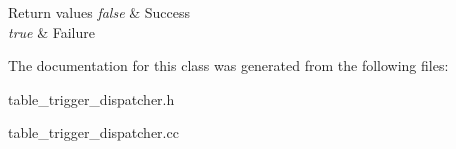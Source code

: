 \begin{DoxyRetVals}{Return values}
{\em false} & Success \\
\hline
{\em true} & Failure \\
\hline
\end{DoxyRetVals}


The documentation for this class was generated from the following files\+:\begin{DoxyCompactItemize}
\item 
table\+\_\+trigger\+\_\+dispatcher.\+h\item 
table\+\_\+trigger\+\_\+dispatcher.\+cc\end{DoxyCompactItemize}
